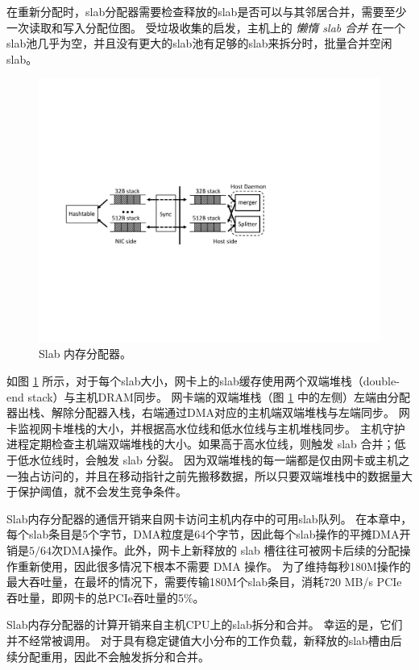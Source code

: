 在重新分配时，slab分配器需要检查释放的slab是否可以与其邻居合并，需要至少一次读取和写入分配位图。
受垃圾收集的启发，主机上的 \textit {懒惰 slab 合并} 在一个slab池几乎为空，并且没有更大的slab池有足够的slab来拆分时，批量合并空闲slab。


\begin{figure}[htbp]
	\centering
	\includegraphics[width=.8\textwidth,page=1]{figure/cropped_slab.pdf}
	\caption{Slab 内存分配器。}
	\label{kvdirect:fig:slab}
\end{figure}

如图 \ref {kvdirect:fig:slab} 所示，对于每个slab大小，网卡上的slab缓存使用两个双端堆栈（double-end stack）与主机DRAM同步。
网卡端的双端堆栈（图 \ref {kvdirect:fig:slab} 中的左侧）左端由分配器出栈、解除分配器入栈，右端通过DMA对应的​​主机端双端堆栈与左端同步。
网卡监视网卡堆栈的大小，并根据高水位线和低水位线与主机堆栈同步。
主机守护进程定期检查主机端双端堆栈的大小。如果高于高水位线，则触发 slab 合并；低于低水位线时，会触发 slab 分裂。
因为双端堆栈的每一端都是仅由网卡或主机之一独占访问的，并且在移动指针之前先搬移数据，所以只要双端堆栈中的数据量大于保护阈值，就不会发生竞争条件。


\label{kvdirect:sec:slab-eval}


Slab内存分配器的通信开销来自网卡访问主机内存中的可用slab队列。
在本章中，每个slab条目是5个字节，DMA粒度是64个字节，因此每个slab操作的平摊DMA开销是$5/64$次DMA操作。此外，网卡上新释放的 slab 槽往往可被网卡后续的分配操作重新使用，因此很多情况下根本不需要 DMA 操作。
为了维持每秒180M操作的最大吞吐量，在最坏的情况下，需要传输180M个slab条目，消耗720 MB/s PCIe吞吐量，即网卡的总PCIe吞吐量的5\%。

Slab内存分配器的计算开销来自主机CPU上的slab拆分和合并。
幸运的是，它们并不经常被调用。
对于具有稳定键值大小分布的工作负载，新释放的slab槽由后续分配重用，因此不会触发拆分和合并。

